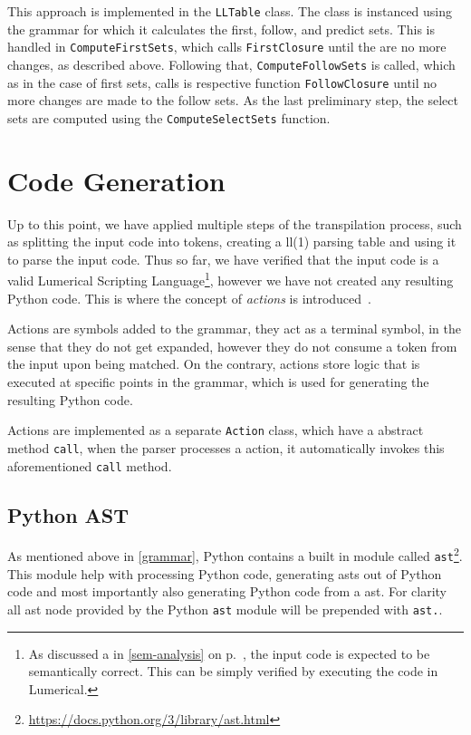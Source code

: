 This approach is implemented in the \texttt{LLTable} class. The class is instanced using the grammar for which it calculates the first, follow, and predict sets. This is handled in \texttt{ComputeFirstSets}, which calls \texttt{FirstClosure} until the are no more changes, as described above. Following that, \texttt{ComputeFollowSets} is called, which as in the case of first sets, calls is respective function \texttt{FollowClosure} until no more changes are made to the follow sets. As the last preliminary step, the select sets are computed using the \texttt{ComputeSelectSets} function. 



\section{Code Generation}\label{sec:code-generation}

Up to this point, we have applied multiple steps of the transpilation process, such as splitting the input code into tokens, creating a \gls{ll}(1) parsing table and using it to parse the input code. Thus so far, we have verified that the input code is a valid Lumerical Scripting Language\footnote{As discussed a in \cref{sem-analysis} on p.~\pageref{sem-analysis}, the input code is expected to be semantically correct. This can be simply verified by executing the code in Lumerical.}, however we have not created any resulting Python code. This is where the concept of \emph{actions} is introduced~\cite{Holub_1990}.

Actions are symbols added to the grammar, they act as a terminal symbol, in the sense that they do not get expanded, however they do not consume a token from the input upon being matched. On the contrary, actions store logic that is executed at specific points in the grammar, which is used for generating the resulting Python code.

Actions are implemented as a separate \texttt{Action} class, which have a abstract method \texttt{call}, when the parser processes a action, it automatically invokes this aforementioned \texttt{call} method.

\subsection{Python AST}

As mentioned above in \cref{grammar}, Python contains a built in module called \texttt{ast}\footnote{\url{https://docs.python.org/3/library/ast.html}}. This module help with processing Python code, generating \glspl{ast} out of Python code and most importantly also generating Python code from a \gls{ast}. For clarity all \gls{ast} node provided by the Python \texttt{ast} module will be prepended with \texttt{ast.}.

